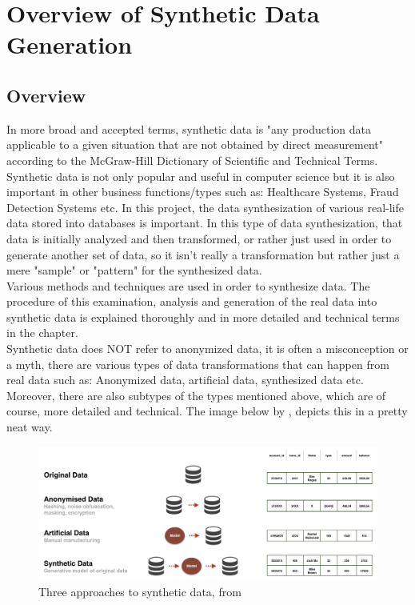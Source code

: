 \chapter{Overview of Synthetic Data Generation}
\section{Overview}
In more broad and accepted terms, synthetic data is "any production data applicable to a given situation that are not obtained by direct measurement" according to the McGraw-Hill Dictionary of Scientific and Technical Terms. \cite{McGrawSyntheticData}\\ Synthetic data is not only popular and useful in computer science but it is also important in other business functions/types such as: Healthcare Systems, Fraud Detection Systems etc. In this project, the data synthesization of various real-life data stored into databases is important. In this type of data synthesization, that data is initially analyzed and then transformed, or rather just used in order to generate another set of data, so it isn't really a transformation but rather just a mere "sample" or "pattern" for the synthesized data.\\
\newline
Various methods and techniques are used in order to synthesize data. The procedure of this examination, analysis and generation of the real data into synthetic data is explained thoroughly and in more detailed and technical terms in the  chapter.\\
Synthetic data does NOT refer to anonymized data, it is often a misconception or a myth, there are various types of data transformations that can happen from real data such as: Anonymized data, artificial data, synthesized data etc. Moreover, there are also subtypes of the types mentioned above, which are of course, more detailed and technical. The image below by \citeauthor{Synthesized_2018}, depicts this in a pretty neat way.
\begin{figure}[H]
	\includegraphics[width=\linewidth]{./Figures/Synthetic_Data/types_of_data_comparison.png}
	\caption{Three approaches to synthetic data, from \citeauthor{Synthesized_2018}}
\end{figure}
\newpage
